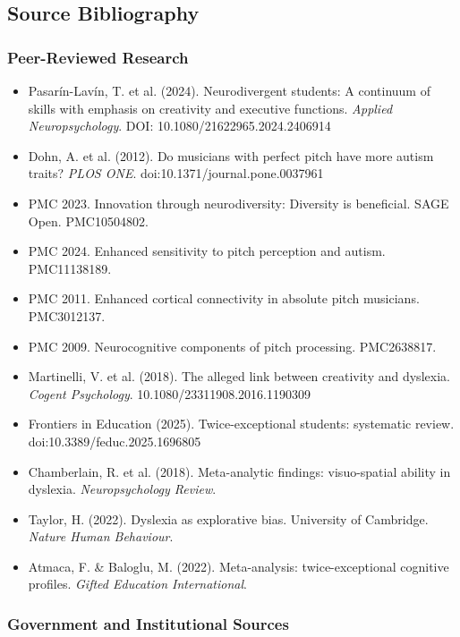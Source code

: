 \documentclass[11pt,letterpaper]{article}
\begin{document}
\subsection{Source Bibliography}

\subsubsection{Peer-Reviewed Research}

\begin{itemize}[leftmargin=*, itemsep=0.2em]
  \item Pasarín-Lavín, T. et al. (2024). Neurodivergent students: A continuum of skills with emphasis on creativity and executive functions. \textit{Applied Neuropsychology}. DOI: 10.1080/21622965.2024.2406914
  \item Dohn, A. et al. (2012). Do musicians with perfect pitch have more autism traits? \textit{PLOS ONE}. doi:10.1371/journal.pone.0037961
  \item PMC 2023. Innovation through neurodiversity: Diversity is beneficial. SAGE Open. PMC10504802.
  \item PMC 2024. Enhanced sensitivity to pitch perception and autism. PMC11138189.
  \item PMC 2011. Enhanced cortical connectivity in absolute pitch musicians. PMC3012137.
  \item PMC 2009. Neurocognitive components of pitch processing. PMC2638817.
  \item Martinelli, V. et al. (2018). The alleged link between creativity and dyslexia. \textit{Cogent Psychology}. 10.1080/23311908.2016.1190309
  \item Frontiers in Education (2025). Twice-exceptional students: systematic review. doi:10.3389/feduc.2025.1696805
  \item Chamberlain, R. et al. (2018). Meta-analytic findings: visuo-spatial ability in dyslexia. \textit{Neuropsychology Review}.
  \item Taylor, H. (2022). Dyslexia as explorative bias. University of Cambridge. \textit{Nature Human Behaviour}.
  \item Atmaca, F. \& Baloglu, M. (2022). Meta-analysis: twice-exceptional cognitive profiles. \textit{Gifted Education International}.
\end{itemize}

\subsubsection{Government and Institutional Sources}
\end{document}
